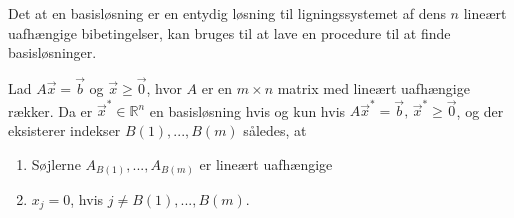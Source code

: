 Det at en basisløsning er en entydig løsning til ligningssystemet af dens $n$ lineært uafhængige bibetingelser, kan bruges til at lave en procedure til at finde basisløsninger.

\begin{stn}
Lad $A\vec{x}=\vec{b}$ og $\vec{x}\geq \vec{0}$, hvor $A$ er en $m\times n$ matrix med lineært uafhængige rækker. Da er $\vec{x}^*\in \mathds{R}^n$ en basisløsning hvis og kun hvis $A\vec{x}^*=\vec{b},  \, \vec{x}^* \geq \vec{0}$, og der eksisterer indekser $B(1), ..., B(m)$ således, at
\begin{enumerate}[label=(\alph*)]
\item Søjlerne $A_{B(1)}, ..., A_{B(m)}$ er lineært uafhængige 
\item $x_j = 0$, hvis $j \neq B(1),...,B(m)$.
\end{enumerate}
\label{stn:kravtilbasis}
\end{stn}

